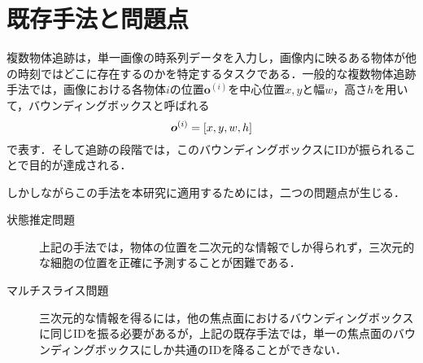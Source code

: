 \section{既存手法と問題点}

複数物体追跡は，単一画像の時系列データを入力し，画像内に映るある物体が他の時刻ではどこに存在するのかを特定するタスクである．一般的な複数物体追跡手法では，画像における各物体$i$の位置$\bm{o}^{(i)}$を中心位置$x,y$と幅$w$，高さ$h$を用いて，バウンディングボックスと呼ばれる
\begin{equation}
    \notag
    \bm{o}^{(i)} = [x, y, w, h]
\end{equation}
で表す．そして追跡の段階では，このバウンディングボックスにIDが振られることで目的が達成される．

しかしながらこの手法を本研究に適用するためには，二つの問題点が生じる．
\begin{description}
    \item[状態推定問題] 上記の手法では，物体の位置を二次元的な情報でしか得られず，三次元的な細胞の位置を正確に予測することが困難である．
    \item[マルチスライス問題] 三次元的な情報を得るには，他の焦点面におけるバウンディングボックスに同じIDを振る必要があるが，上記の既存手法では，単一の焦点面のバウンディングボックスにしか共通のIDを降ることができない．
\end{description}